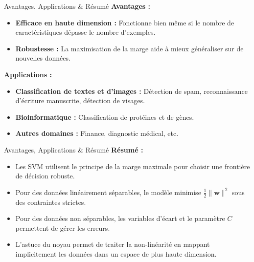 \documentclass{beamer}
\begin{document}
\begin{frame}{Avantages, Applications \& Résumé}
    \textbf{Avantages :}
    \begin{itemize}
        \item \textbf{Efficace en haute dimension :} Fonctionne bien même si le nombre de caractéristiques dépasse le nombre d'exemples.
        \item \textbf{Robustesse :} La maximisation de la marge aide à mieux généraliser sur de nouvelles données.
    \end{itemize}
    \vspace{1em}
    \textbf{Applications :}
    \begin{itemize}
        \item \textbf{Classification de textes et d'images :} Détection de spam, reconnaissance d'écriture manuscrite, détection de visages.
        \item \textbf{Bioinformatique :} Classification de protéines et de gènes.
        \item \textbf{Autres domaines :} Finance, diagnostic médical, etc.
    \end{itemize}
\end{frame}
\begin{frame}{Avantages, Applications \& Résumé}
    \vspace{1em}
    \textbf{Résumé :}
    \begin{itemize}
        \item Les SVM utilisent le principe de la marge maximale pour choisir une frontière de décision robuste.
        \item Pour des données linéairement séparables, le modèle minimise \(\frac{1}{2}\|\mathbf{w}\|^2\) sous des contraintes strictes.
        \item Pour des données non séparables, les variables d'écart et le paramètre \(C\) permettent de gérer les erreurs.
        \item L'astuce du noyau permet de traiter la non-linéarité en mappant implicitement les données dans un espace de plus haute dimension.
    \end{itemize}
\end{frame}
\end{document}
